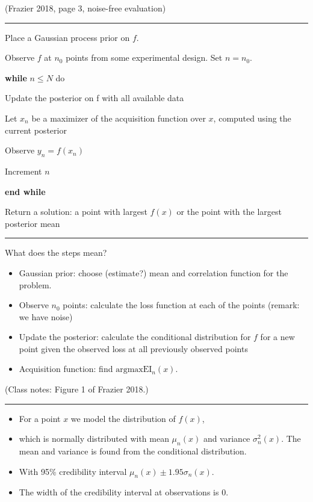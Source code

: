 \documentclass[
  letterpaper,
  DIV=11,
  numbers=noendperiod]{scrartcl}
\providecommand{\tightlist}{%
  \setlength{\itemsep}{0pt}\setlength{\parskip}{0pt}}\usepackage{longtable,booktabs,array}
\begin{document}
(Frazier 2018, page 3, noise-free evaluation)

\begin{center}\rule{0.5\linewidth}{0.5pt}\end{center}

Place a Gaussian process prior on \(f\).

Observe \(f\) at \(n_0\) points from some experimental design. Set
\(n=n_0\).

\textbf{while} \(n \le N\) do

Update the posterior on f with all available data

Let \(x_n\) be a maximizer of the acquisition function over \(x\),
computed using the current posterior

Observe \(y_n=f(x_n)\)

Increment \(n\)

\textbf{end while}

Return a solution: a point with largest \(f(x)\) or the point with the
largest posterior mean

\begin{center}\rule{0.5\linewidth}{0.5pt}\end{center}

What does the steps mean?

\begin{itemize}
\tightlist
\item
  Gaussian prior: choose (estimate?) mean and correlation function for
  the problem.
\item
  Observe \(n_0\) points: calculate the loss function at each of the
  points (remark: we have noise)
\item
  Update the posterior: calculate the conditional distribution for \(f\)
  for a new point given the observed loss at all previously observed
  points
\item
  Acquisition function: find \(\text{argmax}\text{EI}_n(x)\).
\end{itemize}

(Class notes: Figure 1 of Frazier 2018.)

\begin{center}\rule{0.5\linewidth}{0.5pt}\end{center}

\begin{itemize}
\tightlist
\item
  For a point \(x\) we model the distribution of \(f(x)\),
\item
  which is normally distributed with mean \(\mu_n(x)\) and variance
  \(\sigma_n^2(x)\). The mean and variance is found from the conditional
  distribution.
\item
  With 95\% credibility interval \(\mu_n(x)\pm 1.95 \sigma_n(x)\).
\item
  The width of the credibility interval at observations is 0.
\end{itemize}
\end{document}
